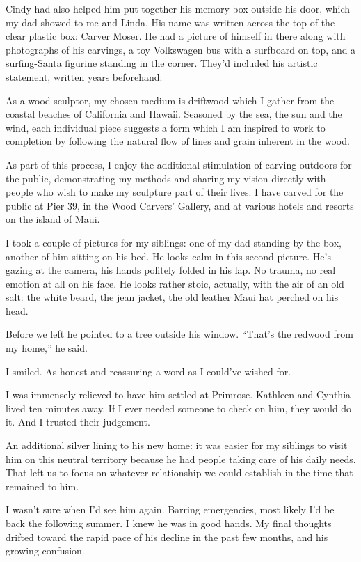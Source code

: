 \documentclass[12pt]{book}
\begin{document}
Cindy had also helped him put together his memory box outside his door, which my dad showed to me and Linda. His name was written across the top of the clear plastic box: Carver Moser. He had a picture of himself in there along with photographs of his carvings, a toy Volkswagen bus with a surfboard on top, and a surfing-Santa figurine standing in the corner. They'd included his artistic statement, written years beforehand:

As a wood sculptor, my chosen medium is driftwood which I gather from the coastal beaches of California and Hawaii. Seasoned by the sea, the sun and the wind, each individual piece suggests a form which I am inspired to work to completion by following the natural flow of lines and grain inherent in the wood.

As part of this process, I enjoy the additional stimulation of carving outdoors for the public, demonstrating my methods and sharing my vision directly with people who wish to make my sculpture part of their lives. I have carved for the public at Pier 39, in the Wood Carvers' Gallery, and at various hotels and resorts on the island of Maui.

I took a couple of pictures for my siblings: one of my dad standing by the box, another of him sitting on his bed. He looks calm in this second picture. He's gazing at the camera, his hands politely folded in his lap. No trauma, no real emotion at all on his face. He looks rather stoic, actually, with the air of an old salt: the white beard, the jean jacket, the old leather Maui hat perched on his head.

Before we left he pointed to a tree outside his window. ``That's the redwood from my home,'' he said.

I smiled. As honest and reassuring a word as I could've wished for.

I was immensely relieved to have him settled at Primrose. Kathleen and Cynthia lived ten minutes away. If I ever needed someone to check on him, they would do it. And I trusted their judgement.

An additional silver lining to his new home: it was easier for my siblings to visit him on this neutral territory because he had people taking care of his daily needs. That left us to focus on whatever relationship we could establish in the time that remained to him.

I wasn't sure when I'd see him again. Barring emergencies, most likely I'd be back the following summer. I knew he was in good hands. My final thoughts drifted toward the rapid pace of his decline in the past few months, and his growing confusion.
\end{document}
